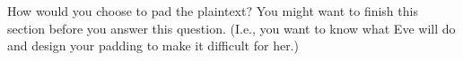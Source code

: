   How would you choose to pad the plaintext?
  You might want to finish this section before you answer this question.
  (I.e., you want to know what Eve will do and design your padding
  to make it difficult for her.)
